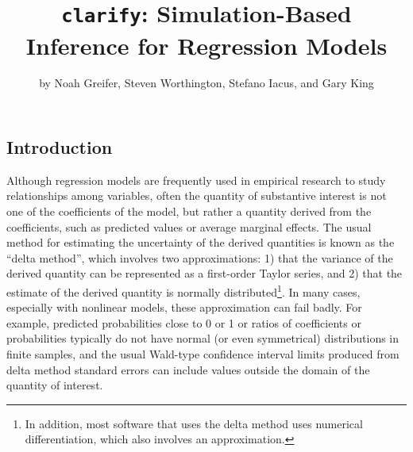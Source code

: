 \title{\texttt{clarify}: Simulation-Based Inference for Regression Models}


\author{by Noah Greifer, Steven Worthington, Stefano Iacus, and Gary King}

\maketitle


\hypertarget{introduction}{%
\subsection{Introduction}\label{introduction}}

Although regression models are frequently used in empirical research to study relationships among variables, often the quantity of substantive interest is not one of the coefficients of the model, but rather a quantity derived from the coefficients, such as predicted values or average marginal effects. The usual method for estimating the uncertainty of the derived quantities is known as the ``delta method'', which involves two approximations: 1) that the variance of the derived quantity can be represented as a first-order Taylor series, and 2) that the estimate of the derived quantity is normally distributed\footnote{In addition, most software that uses the delta method uses numerical differentiation, which also involves an approximation.}. In many cases, especially with nonlinear models, these approximation can fail badly. For example, predicted probabilities close to 0 or 1 or ratios of coefficients or probabilities typically do not have normal (or even symmetrical) distributions in finite samples, and the usual Wald-type confidence interval limits produced from delta method standard errors can include values outside the domain of the quantity of interest.

